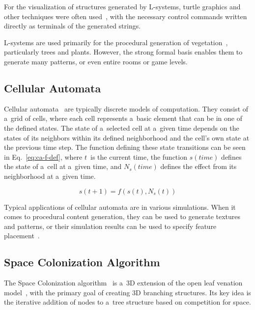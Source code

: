For the visualization of structures generated by L-systems, turtle graphics and other techniques were often used~\cite{l-systems-application-1, l-systems-application-2}, with the necessary control commands written directly as terminals of the generated strings.
 
L-systems are used primarily for the procedural generation of vegetation~\cite{proc-cont-gen-games-survey-hendrikx, l-systems-application-1, l-systems-application-2}, particularly trees and plants. However, the strong formal basis enables them to generate many patterns, or even entire rooms or game levels.

\subsection{Cellular Automata}
Cellular automata~\cite{peringer-hruby-ims, cellular-automata-theory-kari} are typically discrete models of computation. They consist of a~grid of cells, where each cell represents a~basic element that can be in one of the defined states. The state of a~selected cell at a~given time depends on the states of its neighbors within its defined neighborhood and the cell's own state at the previous time step. The function defining these state transitions can be seen in Eq.~\ref{eq:ca-f-def}, where $t$~is the current time, the function $s\left(time\right)$ defines the state of a~cell at a~given time, and $N_s\left(time\right)$ defines the effect from its neighborhood at a~given time.

\begin{equation}\label{eq:ca-f-def}
    s\left(t  + 1\right) = f\left(s\left(t\right), N_s\left(t\right)\right)
\end{equation}

Typical applications of cellular automata are in various simulations. When it comes to procedural content generation, they can be used to generate textures and patterns, or their simulation results can be used to specify feature placement~\cite{proc-cont-gen-games-survey-hendrikx}.

\subsection{Space Colonization Algorithm}\label{space-col-algo}
The Space Colonization algorithm~\cite{space-colonization} is a~3D extension of the open leaf venation model~\cite{leaf-venation}, with the primary goal of creating 3D branching structures. Its key idea is the iterative addition of nodes to a~tree structure based on competition for space.

